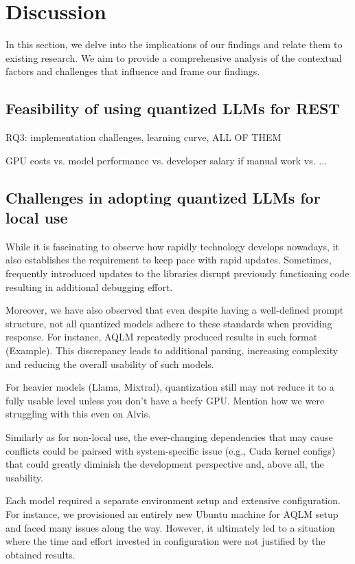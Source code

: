 \documentclass[conference]{IEEEtran}
\begin{document}
\section{Discussion}

In this section, we delve into the implications of our findings and relate them to existing research. We aim to provide a comprehensive analysis of the contextual factors and challenges that influence and frame our findings. 

\subsection{Feasibility of using quantized LLMs for REST}

RQ3: implementation challenges, learning curve,
ALL OF THEM

GPU costs vs. model performance vs. developer salary if manual work vs. ...


\subsection{Challenges in adopting quantized LLMs for local use}

While it is fascinating to observe how rapidly technology develops nowadays, it also establishes the requirement to keep pace with rapid updates. Sometimes, frequently introduced updates to the libraries disrupt previously functioning code resulting in additional debugging effort.

Moreover, we have also observed that even despite having a well-defined prompt structure, not all quantized models adhere to these standards when providing response. For instance, AQLM repeatedly produced results in such format (Example). This discrepancy leads to additional parsing, increasing complexity and reducing the overall usability of such models.

For heavier models (Llama, Mixtral), quantization still may not reduce it to a fully usable level unless you don't have a beefy GPU. Mention how we were struggling with this even on Alvis.

Similarly as for non-local use, the ever-changing dependencies that may cause conflicts could be pairsed with system-specific issue (e.g., Cuda kernel configs) that could greatly diminish the development perspective and, above all, the usability.

Each model required a separate environment setup and extensive configuration. For instance, we provisioned an entirely new Ubuntu machine for AQLM setup and faced many issues along the way. However, it ultimately led to a situation where the time and effort invested in configuration were not justified by the obtained results.
\end{document}
